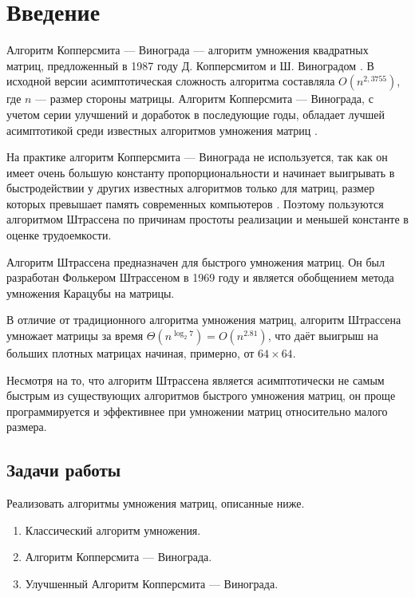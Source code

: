 \chapter*{Введение}

Алгоритм Копперсмита — Винограда — алгоритм умножения квадратных матриц, предложенный в 1987 году Д. Копперсмитом и Ш. Виноградом  \cite{Coppersmith}. В исходной версии асимптотическая сложность алгоритма составляла $O(n^{2,3755})$, где  $n$ — размер стороны матрицы. Алгоритм Копперсмита — Винограда, с учетом серии улучшений и доработок в последующие годы, обладает лучшей асимптотикой среди известных алгоритмов умножения матриц \cite{Cohn}.

На практике алгоритм Копперсмита — Винограда не используется, так как он имеет очень большую константу пропорциональности и начинает выигрывать в быстродействии у других известных алгоритмов только для матриц, размер которых превышает память современных компьютеров \cite{Robinson}. Поэтому пользуются алгоритмом Штрассена по причинам простоты реализации и меньшей константе в оценке трудоемкости.

Алгоритм Штрассена предназначен для быстрого умножения матриц. Он был разработан Фолькером Штрассеном в 1969 году и является обобщением метода умножения Карацубы на матрицы.

В отличие от традиционного алгоритма умножения матриц, алгоритм Штрассена умножает матрицы за время ${\displaystyle \Theta (n^{\log _{2}7})=O(n^{2.81})}$, что даёт выигрыш на больших плотных матрицах начиная, примерно, от $64\times64$.

Несмотря на то, что алгоритм Штрассена является асимптотически не самым быстрым из существующих алгоритмов быстрого умножения матриц, он проще программируется и эффективнее при умножении матриц относительно малого размера.

\section*{Задачи работы}

Реализовать алгоритмы умножения матриц, описанные ниже.

\begin{enumerate}
	\item Классический алгоритм умножения.
	\item Алгоритм Копперсмита — Винограда.
	\item Улучшенный Алгоритм Копперсмита — Винограда.
\end{enumerate}

